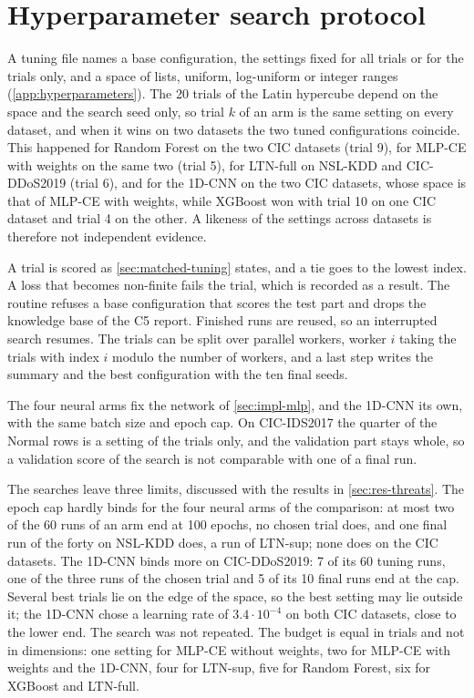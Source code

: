 \section{Hyperparameter search protocol}
\label{sec:impl-tuning}
A tuning file names a base configuration, the settings fixed for all trials or for the trials
only, and a space of lists, uniform, log-uniform or integer ranges (\cref{app:hyperparameters}).
The 20 trials of the Latin hypercube depend on the space and the search seed only, so trial $k$ of
an arm is the same setting on every dataset, and when it wins on two datasets the two tuned
configurations coincide. This happened for Random Forest on the two CIC datasets (trial 9), for MLP-CE with
weights on the same two (trial 5), for LTN-full on NSL-KDD and CIC-DDoS2019 (trial 6), and for the
1D-CNN on the two CIC datasets, whose space is that of MLP-CE with weights, while
XGBoost won with trial 10 on one CIC dataset and trial 4 on the other. A likeness of the
settings across datasets is therefore not independent evidence.

A trial is scored as \cref{sec:matched-tuning} states, and a tie goes to the lowest index. A loss
that becomes non-finite fails the trial, which is recorded as a result. The routine refuses a
base configuration that scores the test part and drops the knowledge base of the C5 report.
Finished runs are reused, so an interrupted search resumes. The trials can be split over
parallel workers, worker $i$ taking the trials with index $i$ modulo the number of workers, and a
last step writes the summary and the best configuration with the ten final seeds.

The four neural arms fix the network of \cref{sec:impl-mlp}, and the 1D-CNN its own, with the
same batch size and epoch cap. On CIC-IDS2017 the quarter of the Normal rows is a setting of the
trials only, and the validation part stays whole, so a validation score of the search is not
comparable with one of a final run.

The searches leave three limits, discussed with the results in \cref{sec:res-threats}. The epoch cap hardly binds for the four neural arms of the
comparison: at most two of the 60 runs of an arm end at 100 epochs, no chosen trial does, and one
final run of the forty on NSL-KDD does, a run of LTN-sup; none does on the CIC datasets. The
1D-CNN binds more on CIC-DDoS2019: 7 of its 60 tuning runs, one of the three runs of the chosen
trial and 5 of its 10 final runs end at the cap. Several best trials lie on the edge of the space,
so the best setting may lie outside it; the 1D-CNN chose a learning rate of $3.4\cdot10^{-4}$ on
both CIC datasets, close to the lower end. The search was not repeated. The budget is equal in trials and not in dimensions: one setting for
MLP-CE without weights, two for MLP-CE with weights and the 1D-CNN, four for LTN-sup, five for
Random Forest, six for XGBoost and LTN-full.

